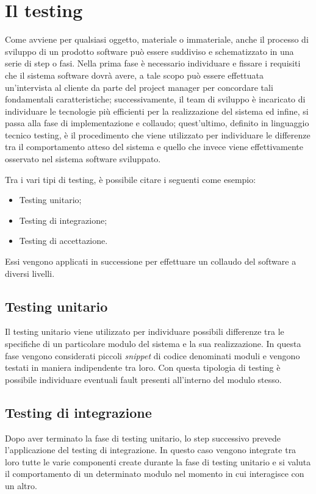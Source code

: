 \section{Il testing}


Come avviene per qualsiasi oggetto, materiale o immateriale, anche il
processo di sviluppo di un prodotto software può essere suddiviso e schematizzato in una serie di step o fasi. Nella prima fase è necessario individuare e fissare i requisiti che il sistema software dovrà avere, a tale scopo può essere effettuata
un’intervista al cliente da parte del project manager per concordare tali fondamentali caratteristiche; successivamente, il team di sviluppo è incaricato di individuare le tecnologie più efficienti per la realizzazione del sistema ed infine, si passa alla fase di implementazione e collaudo; quest’ultimo, definito in linguaggio
tecnico testing, è il procedimento che viene utilizzato per individuare le differenze tra il comportamento atteso del sistema e quello che invece viene effettivamente
osservato nel sistema software sviluppato.

Tra i vari tipi di testing, è possibile citare i seguenti come esempio:
\begin{itemize}
	\item Testing unitario;
	\item Testing di integrazione;
	\item Testing di accettazione.
\end{itemize}

Essi vengono applicati in successione per effettuare un collaudo del software
a diversi livelli.
\subsection{Testing unitario}
Il testing unitario viene utilizzato per individuare possibili differenze tra le specifiche di un particolare modulo del sistema e la sua realizzazione. In questa fase vengono considerati piccoli \emph{snippet} di codice denominati moduli e vengono testati in maniera indipendente tra loro. Con questa tipologia di testing è possibile
individuare eventuali fault presenti all’interno del modulo stesso.
\subsection{Testing di integrazione}
Dopo aver terminato la fase di testing unitario, lo step successivo prevede l’applicazione del testing di integrazione. In questo caso vengono integrate tra loro tutte le varie componenti create durante la fase di testing unitario e si valuta il comportamento di un determinato modulo nel momento in cui interagisce con un altro.


